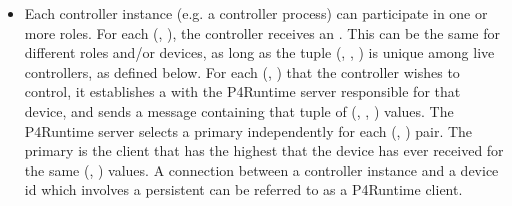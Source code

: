 \documentclass[11pt]{article}
\begin{document}
{\begin{itemize}
\item{}
Each controller instance (e.g. a controller process) can participate in one or
more roles. For each (, ), the controller receives an
. This  can be the same for different roles and/or
devices, as long as the tuple (, , ) is
unique among live controllers, as defined below. For each (,
) that the controller wishes to control, it establishes a
 with the P4Runtime server responsible for that device, and
sends a  message containing that tuple of
(, , ) values. The P4Runtime server selects a
primary independently for each (, ) pair. The primary is the
client that has the highest  that the device has ever received
for the same (, ) values.  A connection between a controller
instance and a device id \textemdash{} which involves a persistent  \textemdash{}
can be referred to as a P4Runtime client.%


\end{itemize}}
\end{document}
